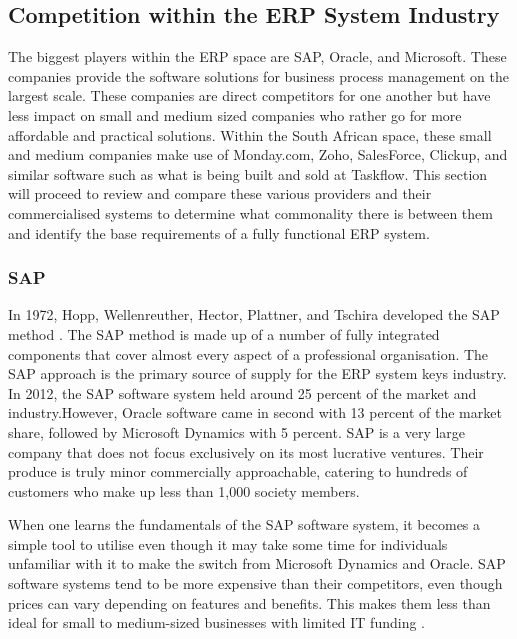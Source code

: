 \subsection{Competition within the ERP System Industry}
\par{The biggest players within the ERP space are SAP, Oracle, and Microsoft. These companies provide the software solutions for business process management on the largest scale. These companies are direct competitors for one another but have less impact on small and medium sized companies who rather go for more affordable and practical solutions. Within the South African space, these small and medium companies make use of Monday.com, Zoho, SalesForce, Clickup, and similar software such as what is being built and sold at Taskflow. This section will proceed to review and compare these various providers and their commercialised systems to determine what commonality there is between them and identify the base requirements of a fully functional ERP system.}
\subsubsection{SAP}
\par{In 1972, Hopp, Wellenreuther, Hector, Plattner, and Tschira developed the SAP method \citep{o2015sap}. The SAP method is made up of a number of fully integrated components that cover almost every aspect of a professional organisation. The SAP approach is the primary source of supply for the ERP system keys industry. In 2012, the SAP software system held around 25 percent of the market and industry.However, Oracle software came in second with 13 percent of the market share, followed by Microsoft Dynamics with 5 percent. SAP is a very large company that does not focus exclusively on its most lucrative ventures. Their produce is truly minor commercially approachable, catering to hundreds of customers who make up less than 1,000 society members. 

When one learns the fundamentals of the SAP software system, it becomes a simple tool to utilise even though it may take some time for individuals unfamiliar with it to make the switch from Microsoft Dynamics and Oracle. SAP software systems tend to be more expensive than their competitors, even though prices can vary depending on features and benefits. This makes them less than ideal for small to medium-sized businesses with limited IT funding \citep{annamalai2011enterprise}.}
